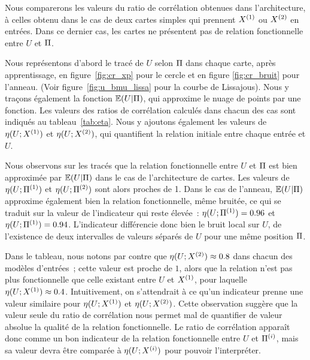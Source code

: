 \documentclass[../main]{subfiles}
\begin{document}
Nous comparerons les valeurs du ratio de corrélation obtenues dans l'architecture, à celles obtenu dans le cas de deux cartes simples qui prennent $X^{({1})}$ ou $X^{({2})}$ en entrées. 
Dans ce dernier cas, les cartes ne présentent pas de relation fonctionnelle entre $U$ et $\Pi$.

Nous représentons d'abord le tracé de $U$ selon $\Pi$ dans chaque carte, après apprentissage, en figure~\ref{fig:cr_xp} pour le cercle et en figure \ref{fig:cr_bruit} pour l'anneau. (Voir figure~\ref{fig:u_bmu_lissa} pour la courbe de Lissajous).
Nous y traçons également la fonction $\mathbb{E}(U|\Pi)$, qui approxime le nuage de points par une fonction. 
Les valeurs des ratios de corrélation calculés dans chacun des cas sont indiqués au tableau~\ref{tab:eta}.
Nous y ajoutons également les valeurs de $\eta(U;X^{({1})})$ et $\eta(U;X^{({2})})$, qui quantifient la relation initiale entre chaque entrée et $U$.


Nous observons sur les tracés que la relation fonctionnelle entre $U$ et $\Pi$ est bien approximée par $\mathbb{E}(U|\Pi)$ dans le cas de l'architecture de cartes. Les valeurs de $\eta(U;\Pi^{({1})})$ et $\eta(U;\Pi^{({2})})$ sont alors proches de 1. 
Dans le cas de l'anneau, $\mathbb{E}(U|\Pi)$ approxime également bien la relation fonctionnelle, même bruitée, ce qui se traduit sur la valeur de l'indicateur qui reste élevée~: $\eta(U;\Pi^{({1})}) = 0.96$ et  $\eta(U;\Pi^{({1})}) = 0.94$. 
L'indicateur différencie donc bien le bruit local sur $U$, de l'existence de deux intervalles de valeurs séparés de $U$ pour une même position $\Pi$.

Dans le tableau, nous notons par contre que $\eta(U;X^{({2})}) \approx 0.8$ dans chacun des modèles d'entrées~; cette valeur est proche de $1$, alors que la relation n'est pas \og plus fonctionnelle \fg{} que celle existant entre $U$ et $X^{({1})}$, pour laquelle $\eta(U;X^{({1})}) \approx 0.4$. Intuitivement, on s'attendrait à ce qu'un indicateur prenne une valeur similaire pour $\eta(U;X^{({1})})$ et $\eta(U;X^{({2})})$. Cette observation suggère que la valeur seule du ratio de corrélation nous permet mal de quantifier de valeur absolue la qualité de la relation fonctionnelle.
Le ratio de corrélation apparaît donc comme un bon indicateur de la relation fonctionnelle entre $U$ et $\Pi^{({i})}$, mais sa valeur devra être comparée à $\eta(U;X^{({i})})$ pour pouvoir l'interpréter.
\end{document}
